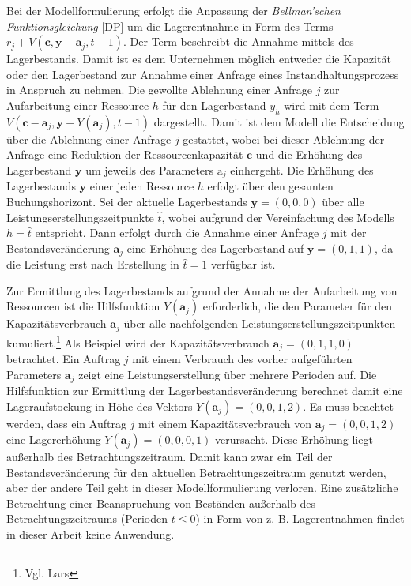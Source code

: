 Bei der Modellformulierung erfolgt die Anpassung der \textit{Bellman'schen Funktionsgleichung}  \eqref{DP} um die Lagerentnahme in Form des Terms $r_{j} + V(\textbf{c}, \textbf{y}-\textbf{a}_j, t-1)$. Der Term beschreibt die Annahme mittels des Lagerbestands. Damit ist es dem Unternehmen möglich entweder die Kapazität oder den Lagerbestand zur Annahme einer Anfrage eines Instandhaltungsprozess in Anspruch zu nehmen. Die gewollte Ablehnung einer Anfrage $j$ zur Aufarbeitung einer Ressource $h$ für den Lagerbestand $y_h$ wird mit dem Term $V(\textbf{c}-\textbf{a}_j, \textbf{y}+Y(\textbf{a}_j), t-1)$ dargestellt. Damit ist dem Modell die Entscheidung über die Ablehnung einer Anfrage $j$ gestattet, wobei bei dieser Ablehnung der Anfrage eine Reduktion der Ressourcenkapazität $\textbf{c}$ und die Erhöhung des Lagerbestand $\textbf{y}$ um jeweils des Parameters $\text{a}_j$ einhergeht. Die Erhöhung des Lagerbestands $\textbf{y}$ einer jeden Ressource $h$ erfolgt über den gesamten Buchungshorizont. Sei der aktuelle Lagerbestands $\textbf{y}=(0,0,0)$ über alle Leistungserstellungszeitpunkte $\hat t$, wobei aufgrund der Vereinfachung des Modells $h=\hat t$ entspricht. Dann erfolgt durch die Annahme einer Anfrage $j$ mit der Bestandsveränderung $\textbf{a}_j$ eine Erhöhung des Lagerbestand auf $\textbf{y}=(0,1,1)$, da die Leistung erst nach Erstellung in $\hat{t}=1$ verfügbar ist.

Zur Ermittlung des Lagerbestands aufgrund der Annahme der Aufarbeitung von Ressourcen ist die Hilfsfunktion $Y(\textbf{a}_j)$ erforderlich, die den Parameter für den Kapazitätsverbrauch $\textbf{a}_j$ über alle nachfolgenden Leistungserstellungszeitpunkten kumuliert.\footnote{Vgl. Lars} Als Beispiel wird der Kapazitätsverbrauch $\textbf{a}_j=(0,1,1,0)$ betrachtet. Ein Auftrag $j$ mit einem Verbrauch des vorher aufgeführten Parameters $\textbf{a}_j$ zeigt eine Leistungserstellung über mehrere Perioden auf. Die Hilfsfunktion zur Ermittlung der Lagerbestandsveränderung berechnet damit eine Lageraufstockung in Höhe des Vektors $Y(\textbf{a}_j)=(0,0,1,2)$. Es muss beachtet werden, dass ein Auftrag $j$ mit einem Kapazitätsverbrauch von $\textbf{a}_j=(0,0,1,2)$ eine Lagererhöhung $Y(\textbf{a}_j)=(0,0,0,1)$ verursacht. Diese Erhöhung liegt außerhalb des Betrachtungszeitraum. Damit kann zwar ein Teil der Bestandsveränderung für den aktuellen Betrachtungszeitraum genutzt werden, aber der andere Teil geht in dieser Modellformulierung verloren. Eine zusätzliche Betrachtung einer Beanspruchung von Beständen außerhalb des Betrachtungszeitraums (Perioden $t\le0$) in Form von z. B. Lagerentnahmen findet in dieser Arbeit keine Anwendung. 

